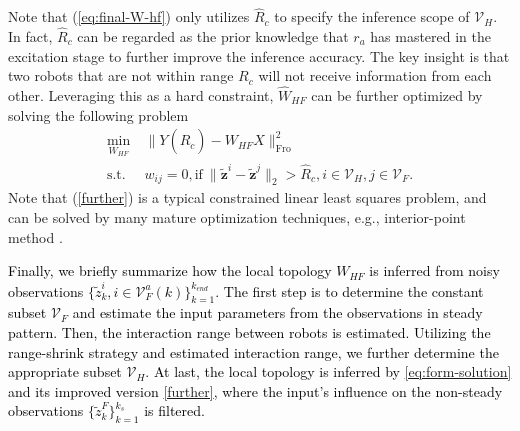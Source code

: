 \documentclass[12pt,journal,draftclsnofoot,onecolumn]{IEEEtran}
\let \sss=\scriptscriptstyle
\begin{document}
Note that (\ref{eq:final-W-hf}) only utilizes $\hat{R}_c$ to specify the inference scope of $\mathcal{V}_{\sss H}$. 
In fact, $\hat{R}_c$ can be regarded as the prior knowledge that $r_a$ has mastered in the excitation stage to further improve the inference accuracy.  
The key insight is that two robots that are not within range $R_c$ will not receive information from each other.  
Leveraging this as a hard constraint, $\hat W_{\sss HF}$ can be further optimized by solving the following problem 
\begin{subequations} \label{further}
\begin{align}
\mathop {\min }\limits_{{W_{\sss HF}}} ~& \| Y(\hat R_c) - {W_{\sss HF}}X  \|_{\sss \text{Fro}}^2  \\
\text{s.t.}~~&w_{ij}=0,\text{if}~\|\tilde{\mathbf z}^i-\tilde{\mathbf z}^j\|_2>\hat R_c, i\in\mathcal{V}_{\sss H},j\in\mathcal{V}_{\sss F}.
\end{align}
\end{subequations}
Note that (\ref{further}) is a typical constrained linear least squares problem, and can be solved by many mature optimization techniques, e.g., interior-point method \cite{boyd2004convex}. 


\textcolor{black}{
Finally, we briefly summarize how the local topology $W_{\sss HF}$ is inferred from noisy observations $\{ \tilde{z}_{k}^{i},i\!\in\!\mathcal{V}_{\sss F}^{a}(k)\}_{k=1}^{k_{end}}$. 
The first step is to determine the constant subset $\mathcal{V}_{\sss F}$ and estimate the input parameters from the observations in steady pattern. 
Then, the interaction range between robots is estimated. 
Utilizing the range-shrink strategy and estimated interaction range, we further determine the appropriate subset $\mathcal{V}_{\sss H}$. 
At last, the local topology is inferred by \eqref{eq:form-solution} and its improved version \eqref{further}, where the input's influence on the non-steady observations $\{ \tilde{z}_{k}^{\sss F} \}_{k=1}^{k_s}$ is filtered. }
\end{document}
